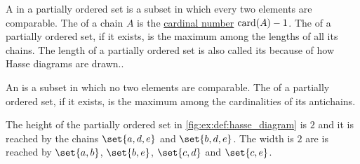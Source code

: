 \begin{definition}\label{def:partially_ordered_set_chain_and_antichain}
  A  in a partially ordered set is a subset in which every two elements are comparable. The  of a chain \( A \) is the \hyperref[def:cardinal]{cardinal number} \( \operatorname{card}(A) - 1 \). The  of a partially ordered set, if it exists, is the maximum among the lengths of all its chains. The length of a partially ordered set is also called its  because of how Hasse diagrams are drawn..

  An  is a subset in which no two elements are comparable. The  of a partially ordered set, if it exists, is the maximum among the cardinalities of its antichains.

  The height of the partially ordered set in \cref{fig:ex:def:hasse_diagram} is \( 2 \) and it is reached by the chains \( \set{ a, d, e } \) and \( \set{ b, d, e } \). The width is \( 2 \) are is reached by \( \set{ a, b } \), \( \set{ b, e } \), \( \set{ c, d } \) and \( \set{ c, e } \).
\end{definition}

